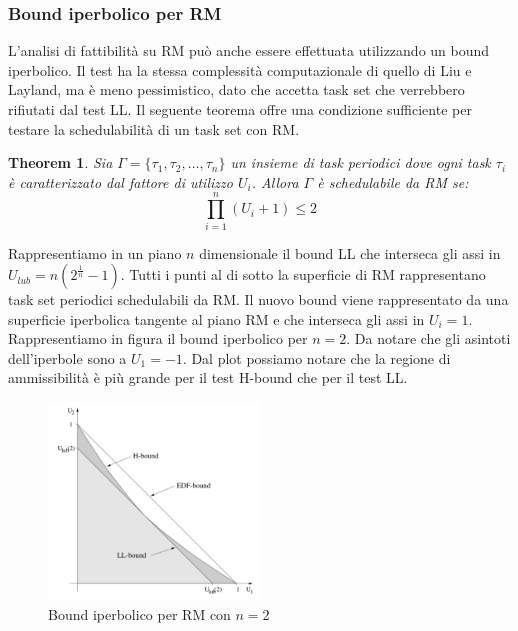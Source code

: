 \documentclass[12pt,openany,onesided]{book}
\newtheorem{theorem}{Theorem}
\begin{document}
\subsubsection{Bound iperbolico per RM}
L'analisi di fattibilità su RM può anche essere effettuata utilizzando un bound iperbolico.
Il test ha la stessa complessità computazionale di quello di Liu e Layland, ma è meno pessimistico, dato che accetta task set che verrebbero rifiutati dal test LL.
Il seguente teorema offre una condizione sufficiente per testare la schedulabilità di un task set con RM.
\begin{theorem}
    
    Sia $\Gamma=\{\tau_1,\tau_2,\dots,\tau_n\}$ un insieme di task periodici dove ogni task $\tau_i$ è caratterizzato dal fattore di utilizzo $U_i$. Allora $\Gamma$ è schedulabile da RM se:
    \begin{equation}
        \label{eq:boundIperbolico}
        \prod_{i=1}^{n}(U_i+1) \leq 2
    \end{equation}
\end{theorem}
Rappresentiamo in un piano $n$ dimensionale il bound LL che interseca gli assi in $U_{lub}=n(2^{\frac{1}{n}}-1)$.
Tutti i punti al di sotto la superficie di RM rappresentano task set periodici schedulabili da RM.
Il nuovo bound viene rappresentato da una superficie iperbolica tangente al piano RM e che interseca gli assi in $U_i=1$.
Rappresentiamo in figura il bound iperbolico per $n=2$. Da notare che gli asintoti dell'iperbole sono a $U_1=-1$.
Dal plot possiamo notare che la regione di ammissibilità è più grande per il test H-bound che per il test LL.
\begin{figure}[H]
    \centering
    \includegraphics[width=0.5\textwidth]{pictures/boundIperbolico.png}
    \caption{Bound iperbolico per RM con $n=2$}
\end{figure}
\end{document}
